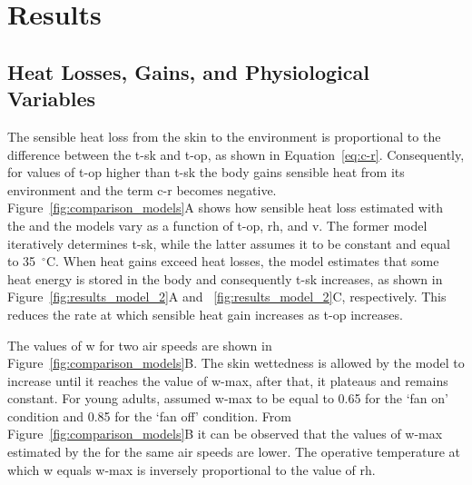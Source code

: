 
\section{Results}\label{sec:results}

\subsection{Heat Losses, Gains, and Physiological Variables}\label{subsec:res-heat-loss-physiological}

The sensible heat loss from the skin to the environment is proportional to the difference between the \ac{t-sk} and \ac{t-op}, as shown in Equation~\ref{eq:c-r}.
Consequently, for values of \ac{t-op} higher than \ac{t-sk} the body gains sensible heat from its environment and the term \ac{c-r} becomes negative.
Figure~\ref{fig:comparison_models}A shows how sensible heat loss estimated with the  and the  models vary as a function of \ac{t-op}, \ac{rh}, and \ac{v}.
The former model iteratively determines \ac{t-sk}, while the latter assumes it to be constant and equal to 35~$^{\circ}$C\@.
When heat gains exceed heat losses, the  model estimates that some heat energy is stored in the body and consequently \ac{t-sk} increases, as shown in Figure~\ref{fig:results_model_2}A and ~\ref{fig:results_model_2}C, respectively.
This reduces the rate at which sensible heat gain increases as \ac{t-op} increases.

The values of \ac{w} for two air speeds are shown in Figure~\ref{fig:comparison_models}B\@.
The skin wettedness is allowed by the model to increase until it reaches the value of \ac{w-max}, after that, it plateaus and remains constant.
For young adults,  assumed \ac{w-max} to be equal to 0.65 for the `fan on' condition and 0.85 for the `fan off' condition.
From Figure~\ref{fig:comparison_models}B it can be observed that the values of \ac{w-max} estimated by the  for the same air speeds are lower.
The operative temperature at which \ac{w} equals \ac{w-max} is inversely proportional to the value of \ac{rh}.

